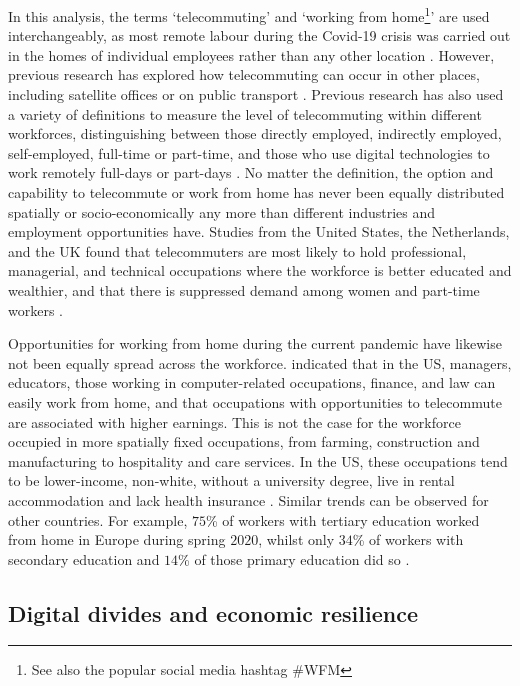 \documentclass[]{interact}
\theoremstyle{plain}%
\theoremstyle{definition}
\theoremstyle{remark}
\begin{document}
In this analysis, the terms `telecommuting' and `working from
home\footnote{See also the popular social media hashtag \#WFM}' are used
interchangeably, as most remote labour during the Covid-19 crisis was
carried out in the homes of individual employees rather than any other
location \citep{eurofound2020}. However, previous research has explored
how telecommuting can occur in other places, including satellite offices
or on public transport \citep{felstead2012rapid, siha2006telecommuting}.
Previous research has also used a variety of definitions to measure the
level of telecommuting within different workforces, distinguishing
between those directly employed, indirectly employed, self-employed,
full-time or part-time, and those who use digital technologies to work
remotely full-days or part-days
\citep{allen2015effective, bailey2002review, haddad2009examination}. No
matter the definition, the option and capability to telecommute or work
from home has never been equally distributed spatially or
socio-economically any more than different industries and employment
opportunities have. Studies from the United States, the Netherlands, and
the UK found that telecommuters are most likely to hold professional,
managerial, and technical occupations where the workforce is better
educated and wealthier, and that there is suppressed demand among women
and part-time workers
\citep{headicar2016move, peters2004employees, singh2013modeling}.

Opportunities for working from home during the current pandemic have
likewise not been equally spread across the workforce.
\citet{NBERw26948} indicated that in the US, managers, educators, those
working in computer-related occupations, finance, and law can easily
work from home, and that occupations with opportunities to telecommute
are associated with higher earnings. This is not the case for the
workforce occupied in more spatially fixed occupations, from farming,
construction and manufacturing to hospitality and care services. In the
US, these occupations tend to be lower-income, non-white, without a
university degree, live in rental accommodation and lack health
insurance \citep{NBERw27085}. Similar trends can be observed for other
countries. For example, \(75\)\% of workers with tertiary education
worked from home in Europe during spring \(2020\), whilst only \(34\)\%
of workers with secondary education and \(14\)\% of those primary
education did so \citep{eurofound2020}.

\hypertarget{sec:2.2}{%
\subsection{Digital divides and economic resilience}\label{sec:2.2}}
\end{document}
